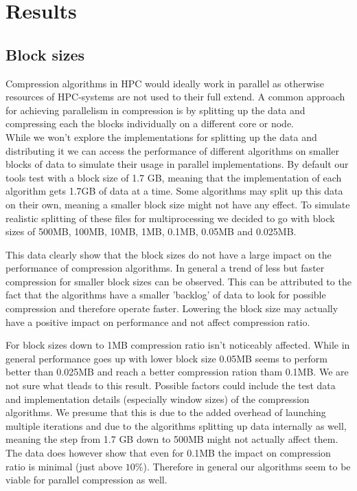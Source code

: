 \documentclass[
	12pt,
	a4paper,
	BCOR10mm,
	DIV14,
	listof=totoc,
	bibliography=totoc,
	headsepline
]{scrreprt}
\begin{document}
\FloatBarrier
\section{Results}
\label{Results}


\subsection{Block sizes}
Compression algorithms in HPC would ideally work in parallel as otherwise resources of HPC-systems are not used to their full extend.
A common approach for achieving parallelism in compression is by splitting up the data and compressing each the blocks individually on a different core or node\cite{BenComp}. \\
While we won't explore the implementations for splitting up the data and distributing it we can access the performance of different algorithms on smaller blocks of data to simulate their usage in parallel implementations.
By default our tools test with a block size of 1.7 GB, meaning that the implementation of each algorithm gets 1.7GB of data at a time.
Some algorithms may split up this data on their own, meaning a smaller block size might not have any effect.
To simulate realistic splitting of these files for multiprocessing we decided to go with block sizes of 500MB, 100MB, 10MB, 1MB, 0.1MB, 0.05MB and 0.025MB.


This data clearly show that the block sizes do not have a large impact on the performance of compression algorithms.
In general a trend of less but faster compression for smaller block sizes can be observed.
This can be attributed to the fact that the algorithms have a smaller 'backlog' of data to look for possible compression and therefore operate faster\cite{ResComp}.
Lowering the block size may actually have a positive impact on performance and not affect compression ratio.

For block sizes down to 1MB compression ratio isn't noticeably affected.
While in general performance goes up with lower block size 0.05MB seems to perform better than 0.025MB and reach a better compression ration tham 0.1MB.
We are not sure what tleads to this result. Possible factors could include the test data and implementation details (especially window sizes) of the compression algorithms.
We presume that this is due to the added overhead of launching multiple iterations and due to the algorithms splitting up data internally as well, meaning the step from 1.7 GB down to 500MB might not actually affect them.
The data does however show that even for 0.1MB the impact on compression ratio is minimal (just above $10\%$).
Therefore in general our algorithms seem to be viable for parallel compression as well.
\end{document}
